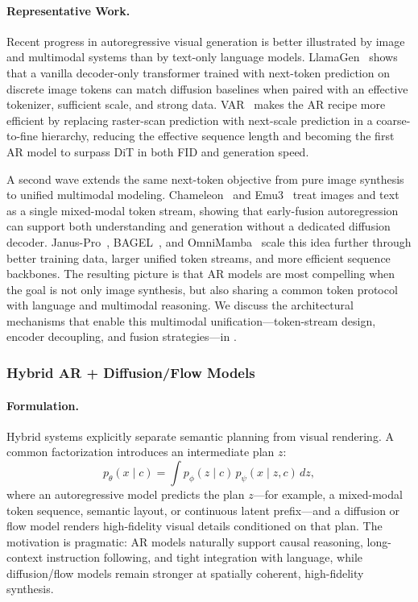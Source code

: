 \paragraph{Representative Work.}
Recent progress in autoregressive visual generation is better illustrated by image and multimodal systems than by text-only language models. LlamaGen~\citep{sun2024autoregressive} shows that a vanilla decoder-only transformer trained with next-token prediction on discrete image tokens can match diffusion baselines when paired with an effective tokenizer, sufficient scale, and strong data. VAR~\citep{tian2024visual} makes the AR recipe more efficient by replacing raster-scan prediction with next-scale prediction in a coarse-to-fine hierarchy, reducing the effective sequence length and becoming the first AR model to surpass DiT in both FID and generation speed.

A second wave extends the same next-token objective from pure image synthesis to unified multimodal modeling. Chameleon~\citep{chameleon2024} and Emu3~\citep{wang2024emu3} treat images and text as a single mixed-modal token stream, showing that early-fusion autoregression can support both understanding and generation without a dedicated diffusion decoder. Janus-Pro~\citep{chen2025janusprounifiedmultimodalunderstanding}, BAGEL~\citep{deng2025bagelemerging}, and OmniMamba~\citep{zou2025omnimamba} scale this idea further through better training data, larger unified token streams, and more efficient sequence backbones. The resulting picture is that AR models are most compelling when the goal is not only image synthesis, but also sharing a common token protocol with language and multimodal reasoning. We discuss the architectural mechanisms that enable this multimodal unification---token-stream design, encoder decoupling, and fusion strategies---in .

\subsubsection{Hybrid AR + Diffusion/Flow Models}
\label{sec:hybrid_ar_diff}

\paragraph{Formulation.}
Hybrid systems explicitly separate semantic planning from visual rendering. A common factorization introduces an intermediate plan $z$:
\begin{equation}
p_{\theta}(x \mid c) = \int p_{\phi}(z \mid c)\, p_{\psi}(x \mid z, c)\, dz,
\end{equation}
where an autoregressive model predicts the plan $z$---for example, a mixed-modal token sequence, semantic layout, or continuous latent prefix---and a diffusion or flow model renders high-fidelity visual details conditioned on that plan. The motivation is pragmatic: AR models naturally support causal reasoning, long-context instruction following, and tight integration with language, while diffusion/flow models remain stronger at spatially coherent, high-fidelity synthesis.

